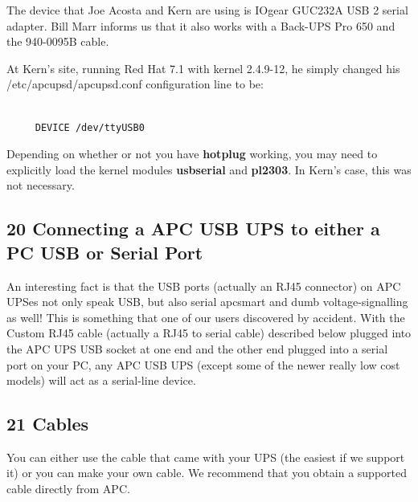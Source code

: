 The device that Joe Acosta and Kern are using is IOgear GUC232A USB 2 serial
adapter. Bill Marr informs us that it also works with a Back-UPS Pro 650 and
the 940-0095B cable.  

At Kern's site, running Red Hat 7.1 with kernel 2.4.9-12, he simply changed
his /etc/apcupsd/apcupsd.conf configuration line to be: 

\footnotesize
\begin{verbatim}
     
     DEVICE /dev/ttyUSB0
\end{verbatim}
\normalsize

Depending on whether or not you have {\bf hotplug} working, you may need to
explicitly load the kernel modules {\bf usbserial} and {\bf pl2303}. In Kern's
case, this was not necessary. 

\label{Connecting-a-APC-USB-UPS-to-either-a-PC-USB-or-Serial-Port}

\subsection*{20 Connecting a APC USB UPS to either a PC USB or Serial Port}

An interesting fact is that the USB ports (actually an RJ45 connector) on APC
UPSes not only speak USB, but also serial apcsmart and dumb voltage-signalling
as well! This is something that one of our users discovered by accident. With
the Custom RJ45 cable (actually a RJ45 to serial cable) described below
plugged into the APC UPS USB socket at one end and the other end plugged into
a serial port on your PC, any APC USB UPS (except some of the newer really low
cost models) will act as a serial-line device. 

\label{Cables}

\subsection*{21 Cables}

\label{index-Cables-191}
You can either use the cable that came with your UPS (the easiest if we
support it) or you can make your own cable. We recommend that you obtain a
supported cable directly from APC.  

